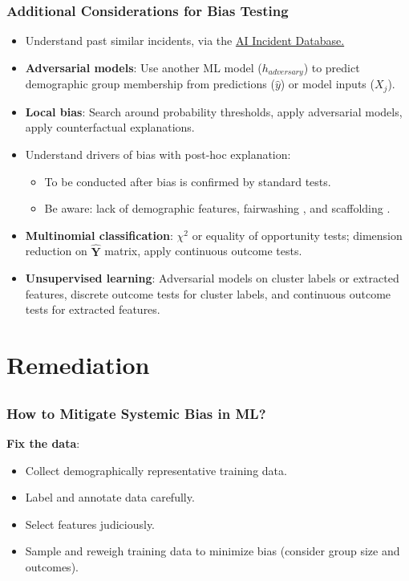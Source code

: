 \documentclass[11pt,aspectratio=169,hyperref={colorlinks}]{beamer}
\begin{document}
		\begin{frame}				
	
			\frametitle{Additional Considerations for Bias Testing}
	
			\begin{itemize}\small
				\item Understand past similar incidents, via the \href{https://incidentdatabase.ai/}{AI Incident Database.}	
				\item \textbf{Adversarial models}: Use another ML model ($h_{adversary}$) to predict demographic group membership from predictions 
				($\hat{y}$) or model inputs ($X_j$). 			
				\item \textbf{Local bias}: Search around probability thresholds, apply adversarial models, apply counterfactual explanations.
				\item Understand drivers of bias with post-hoc explanation:
				\begin{itemize}
					\item To be conducted after bias is confirmed by standard tests.
					\item Be aware: lack of demographic features, fairwashing \cite{fair_washing}, and scaffolding \cite{scaffolding}. 
				\end{itemize}
				\item \textbf{Multinomial classification}: $\chi^{2}$ or equality of opportunity tests; dimension reduction on $\mathbf{\hat{Y}}$ matrix, apply continuous outcome tests.
				\item \textbf{Unsupervised learning}: Adversarial models on cluster labels or extracted features, discrete outcome tests for cluster labels, and continuous outcome tests for extracted features.
			\end{itemize}
		\end{frame}
	
	\section{Remediation}
	
		\subsection*{}

		\begin{frame}			
		
			\frametitle{How to Mitigate Systemic Bias in ML?}
			\Large \textbf{Fix the data}:
			\begin{itemize} 
				\item Collect demographically representative training data.
				\item Label and annotate data carefully.
				\item Select features judiciously.
				\item Sample and reweigh training data to minimize bias (consider group size and outcomes).\cite{kamiran2012data}
			\end{itemize}
			
		\end{frame}	
		
\end{document}
